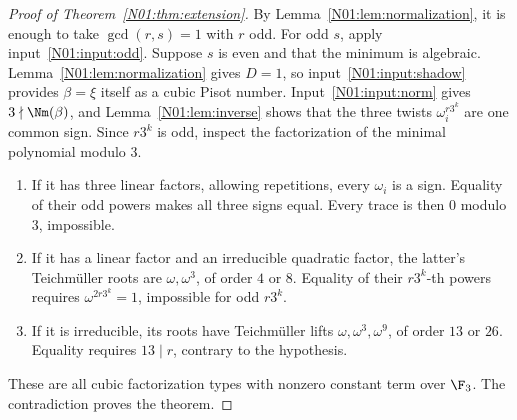 \documentclass[11pt,a4paper]{article}
\theoremstyle{definition}\newtheorem{definition}[theorem]{Definition}
\theoremstyle{remark}\newtheorem{remark}[theorem]{Remark}
\begin{document}
\begin{proof}[Proof of Theorem~\ref{N01:thm:extension}]
By Lemma~\ref{N01:lem:normalization}, it is enough to take
$\gcd(r,s)=1$ with $r$ odd. For odd $s$, apply input~\ref{N01:input:odd}.
Suppose $s$ is even and that the minimum is algebraic.
Lemma~\ref{N01:lem:normalization} gives $D=1$, so input~\ref{N01:input:shadow}
provides $\beta=\xi$ itself as a cubic Pisot number.
Input~\ref{N01:input:norm} gives $3\nmid\Nm(\beta)$, and
Lemma~\ref{N01:lem:inverse} shows that the three twists
$\omega_i^{r3^k}$ are one common sign. Since $r3^k$ is odd, inspect
the factorization of the minimal polynomial modulo $3$.

\begin{enumerate}[label=\textup{(\roman*)}]
\item If it has three linear factors, allowing repetitions, every
$\omega_i$ is a sign. Equality of their odd powers makes all three
signs equal. Every trace is then $0$ modulo $3$, impossible.
\item If it has a linear factor and an irreducible quadratic factor,
the latter's Teichm\"uller roots are $\omega,\omega^3$, of order
$4$ or $8$. Equality of their $r3^k$-th powers requires
$\omega^{2r3^k}=1$, impossible for odd $r3^k$.
\item If it is irreducible, its roots have Teichm\"uller lifts
$\omega,\omega^3,\omega^9$, of order $13$ or $26$.
Equality requires $13\mid r$, contrary to the hypothesis.
\end{enumerate}
These are all cubic factorization types with nonzero constant term
over $\F_3$. The contradiction proves the theorem.
\end{proof}
\end{document}
